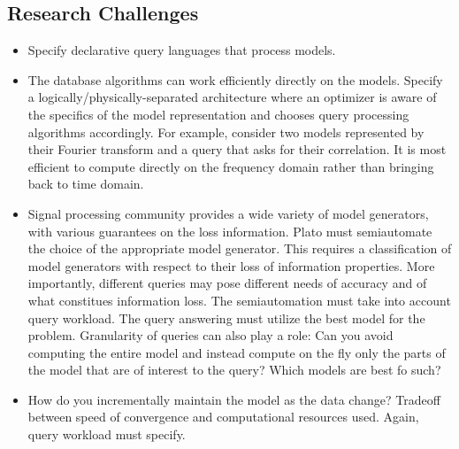 




\subsection{Research Challenges}
\label{sec:challenges}
\begin{itemize}
%
\item Specify declarative query languages that process models.
%
\item The database algorithms can work efficiently directly on the models. Specify a logically/physically-separated architecture where an optimizer is aware of the specifics of the model representation and chooses query processing algorithms accordingly.  For example, consider two models represented by their Fourier transform and a query that asks for their correlation. It is most efficient to compute directly on the frequency domain rather than bringing back to time domain.
%
\item Signal processing community provides a wide variety of model generators, with various guarantees on the loss information. Plato must semiautomate the choice of the appropriate model generator. This requires a classification of model generators with respect to their loss of information properties. More importantly, different queries may pose different needs of accuracy and of what constitues information loss. The semiautomation must take into account query workload. The query answering must utilize the best model for the problem. Granularity of queries can also play a role: Can you avoid computing the entire model and instead compute on the fly only the parts of the model that are of interest to the query? Which models are best fo such?
%
\item How do you incrementally maintain the model as the data change? Tradeoff between speed of convergence and computational resources used. Again, query workload must specify.
\end{itemize}

